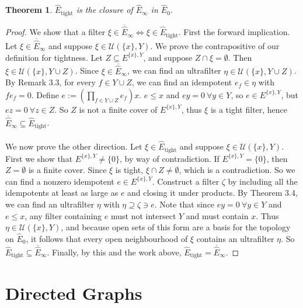 \documentclass{article}
\newtheorem{theorem}{Theorem}[section]
\theoremstyle{definition}
\begin{document}
\begin{theorem} $\hat{E}_{\text{tight}}$ is the closure of $\hat{E}_\infty$ in $\hat{E}_0$. \end{theorem}
\begin{proof}
    We show that a filter $\xi \in \overline{\hat{E}}_\infty \iff \xi \in \hat{E}_{\text{tight}}$. First
    the forward implication. Let $\xi \in \overline{\hat{E}}_\infty$ and suppose $\xi \in \mathcal{U}(\{x\}, Y)$.
    We prove the contrapositive of our definition for tightness. Let $Z \subseteq E^{\{x\}, Y}$, and suppose $Z \cap \xi = \emptyset$.
    Then $\xi \in \mathcal{U}(\{x\}, Y \cup Z)$. Since $\xi \in \overline{\hat{E}}_\infty$, we can find an ultrafilter
    $\eta \in \mathcal{U}(\{x\}, Y \cup Z)$. By Remark 3.3, for every $f \in Y \cup Z$, we can find an idempotent $e_f \in \eta$
    with $f e_f = 0$. Define $e := \left( \prod_{f \in Y \cup Z} e_f \right) x$. $e \leq x$ and $ey = 0 \ \forall y \in Y$, so
    $e \in E^{\{x\}, Y}$, but $ez = 0 \ \forall z \in Z$. So $Z$ is not a finite cover of $E^{\{x\}, Y}$, thus $\xi$ is a tight filter,
    hence $\overline{\hat{E}}_\infty \subseteq \hat{E}_{\text{tight}}$. 
    \\ \\
    We now prove the other direction. Let $\xi \in \hat{E}_{\text{tight}}$ and suppose $\xi \in \mathcal{U}(\{x\}, Y)$.
    First we show that $E^{\{x\}, Y} \neq \{0\}$, by way of contradiction. If $E^{\{x\}, Y} = \{0\}$, then $Z = \emptyset$ is a finite cover.
    Since $\xi$ is tight, $\xi \cap Z \neq \emptyset$, which is a contradiction. So we can find a nonzero idempotent $e \in E^{\{x\}, Y}$.
    Construct a filter $\zeta$ by including all the idempotents at least as large as $e$ and closing it under products. 
    By Theorem 3.4, we can find an ultrafilter $\eta$ with $\eta \supseteq \zeta \ni e$. Note that since 
    $ey = 0 \ \forall y \in Y$ and $e \leq x$, any filter containing $e$ must not intersect $Y$ and must contain $x$.
    Thus $\eta \in \mathcal{U}(\{x\}, Y)$, and because open sets of this form are a basis for the topology on $\hat{E}_0$,
    it follows that every open neighbourhood of $\xi$ contains an ultrafilter $\eta$. So $\hat{E}_\text{tight} \subseteq \overline{\hat{E}}_\infty$.
    Finally, by this and the work above, $\hat{E}_\text{tight} = \overline{\hat{E}}_\infty$.
\end{proof}

\section{Directed Graphs}
\end{document}
